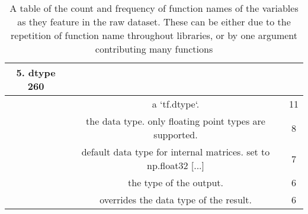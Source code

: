 \begin{table}[h]
\begin{center}
\begin{tabular}{c | c | c }
5. dtype   260 \\
\hline
&  a `tf.dtype`.                                                       & 11 \\
&  the data type. only floating point types are supported.             & 8 \\
&  default data type for internal matrices. set to np.float32  [...]   & 7 \\
&  the type of the output.                                             & 6 \\
&  overrides the data type of the result.                              & 6 \\


    \end{tabular}
        \caption { A table of the count and frequency of function names of the variables as they feature in the raw dataset. 
        These can be either due to the repetition of function name throughout libraries, or by one argument contributing many functions }
    \label{table:function_histogram} 
    \end{center}
\end{table}

